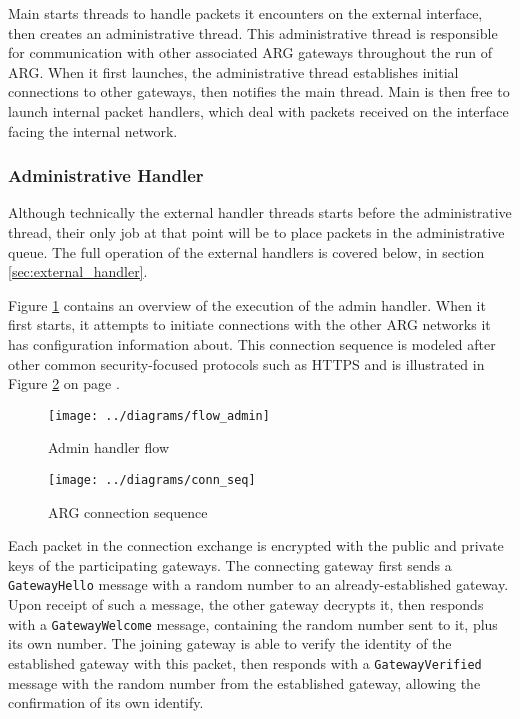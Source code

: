 \par Main starts threads to handle packets it encounters on the external interface, then creates an administrative thread. This administrative thread is responsible for communication with other associated ARG gateways throughout the run of ARG. When it first launches, the administrative thread establishes initial connections to other gateways, then notifies the main thread. Main is then free to launch internal packet handlers, which deal with packets received on the interface facing the internal network.

\subsubsection{Administrative Handler}
\label{sec:admin_handler}

\par Although technically the external handler threads starts before the administrative thread, their only job at that point will be to place packets in the administrative queue. The full operation of the external handlers is covered below, in section \ref{sec:external_handler}.

\par Figure \ref{fig:flow_admin} contains an overview of the execution of the admin handler. When it first starts, it attempts to initiate connections with the other ARG networks it has configuration information about. This connection sequence is modeled after other common security-focused protocols such as HTTPS \cite{rfc2818} and is illustrated in Figure \ref{fig:conn_seq} on page \pageref{fig:conn_seq}.

\begin{figure}
	\centering
	\texttt{[image: ../diagrams/flow\_admin]}
	\caption{Admin handler flow}
	\label{fig:flow_admin}
\end{figure}

\begin{figure}
	\centering
	\texttt{[image: ../diagrams/conn\_seq]}
	\caption{ARG connection sequence}
	\label{fig:conn_seq}
\end{figure}

\par Each packet in the connection exchange is encrypted with the public and private keys of the participating gateways. The connecting gateway first sends a \texttt{GatewayHello} message with a random number to an already-established gateway. Upon receipt of such a message, the other gateway decrypts it, then responds with a \texttt{GatewayWelcome} message, containing the random number sent to it, plus its own number. The joining gateway is able to verify the identity of the established gateway with this packet, then responds with a \texttt{GatewayVerified} message with the random number from the established gateway, allowing the confirmation of its own identify.

